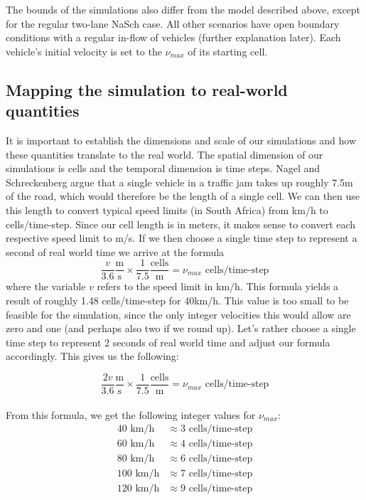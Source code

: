 \documentclass[11pt]{article}
\begin{document}
	The bounds of the simulations also differ from the model described above, except for the regular two-lane NaSch case. All other scenarios have open boundary conditions with a regular in-flow of vehicles (further explanation later). Each vehicle's initial velocity is set to the $\nu_{max}$ of its starting cell. 
	
	\subsection{Mapping the simulation to real-world quantities}\label{subsec:quantmap}
	
	It is important to establish the dimensions and scale of our simulations and how these quantities translate to the real world. The spatial dimension of our simulations is cells and the temporal dimension is time steps. Nagel and Schreckenberg argue that a single vehicle in a traffic jam takes up roughly 7.5m of the road, which would therefore be the length of a single cell. We can then use this length to convert typical speed limits (in South Africa) from km/h to cells/time-step. Since our cell length is in meters, it makes sense to convert each respective speed limit to m/s. If we then choose a single time step to represent a second of real world time we arrive at the formula
	\[ \frac{v}{3.6} \frac{\text{m}}{\text{s}} \times \frac{1}{7.5} \frac{\text{cells}}{\text{m}} = \nu_{max} \text{ cells/time-step} \]
	where the variable $v$ refers to the speed limit in km/h. 
	This formula yields a result of roughly 1.48 cells/time-step for 40km/h. This value is too small to be feasible for the simulation, since the only integer velocities this would allow are zero and one (and perhaps also two if we round up). Let's rather choose a single time step to represent 2 seconds of real world time and adjust our formula accordingly. This gives us the following:
	
	\[ \frac{2v}{3.6} \frac{\text{m}}{\text{s}} \times \frac{1}{7.5} \frac{\text{cells}}{\text{m}} = \nu_{max} \text{ cells/time-step} \] \\
	
	From this formula, we get the following integer values for $\nu_{max}$:
	\begin{align*}
		40 \text{ km/h} &\approx 3 \text{ cells/time-step} \\
		60 \text{ km/h} &\approx 4 \text{ cells/time-step} \\
		80 \text{ km/h} &\approx 6 \text{ cells/time-step} \\
		100 \text{ km/h} &\approx 7 \text{ cells/time-step} \\
		120 \text{ km/h} &\approx 9 \text{ cells/time-step} \\
	\end{align*}
\end{document}
